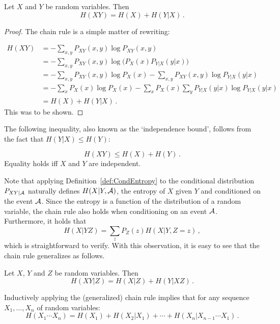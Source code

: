 \begin{proposition} 
Let $X$ and $Y$ be random variables. Then
\[
H(XY)= H(X) + H(Y|X) \, .
\]
\end{proposition}

\begin{proof}
The chain rule is a simple matter of rewriting:

\begin{align*}
H(XY) &= -\sum_{x,y} P_{XY}(x,y)\log P_{XY}(x,y) \\
&= -\sum_{x,y} P_{XY}(x,y)\log\bigl(P_X(x)P_{Y|X}(y|x)\bigr) \\
&= -\sum_{x,y} P_{XY}(x,y) \log P_X(x)  -\sum_{x,y}
P_{XY}(x,y) \log P_{Y|X}(y|x) \\
&=  -\sum_{x}P_X(x)\log P_X(x) - \sum_{x} P_X(x)\sum_{y} P_{Y|X}(y|x) \log
P_{Y|X}(y|x) \\
&= H(X) + H(Y|X) \, .
\end{align*}
This was to be shown. 
\end{proof}
The following inequality, also known as the `independence bound', follows from the fact that $H(Y|X)\leq H(Y)$:
\begin{corollary}[Subadditivity]
\[
H(XY)\leq H(X)+H(Y) \, .
\]
Equality holds iff $X$ and $Y$ are independent.
\end{corollary}

Note that applying Definition~\ref{def:CondEntropy} to the conditional distribution $P_{XY|\cal A}$ naturally defines $H(X|Y,{\cal A})$, the entropy of $X$ given $Y$ and conditioned on the event $\cal A$. 
Since the entropy is a function of the distribution of a random variable, the chain rule also holds when conditioning on an event ${\cal A}$. Furthermore, it holds that
\[
H(X|YZ) = \sum_z P_Z(z) H(X|Y,Z\!=\!z) \, ,
\]
which is straightforward to verify. With this observation, it is easy to see that the chain rule generalizes as follows. 

\begin{corollary}
Let $X$, $Y$ and $Z$ be random variables. Then
\[
H(XY|Z) = H(X|Z) + H(Y|XZ) \, .
\]
\end{corollary}%
Inductively applying the (generalized) chain rule implies that for any sequence $X_1,\ldots,X_n$ of random variables: 
\[
H(X_1\cdots X_n)= H(X_1) + H(X_2|X_1) + \cdots + H(X_n|X_{n-1}\cdots
X_1) \, .
\]

